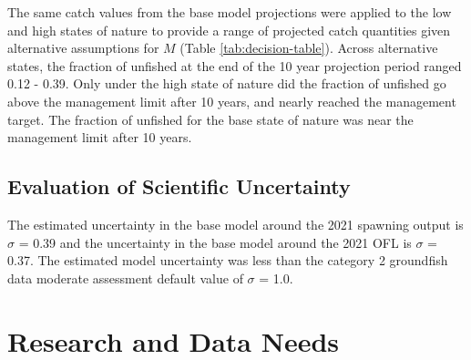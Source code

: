 \documentclass[11pt,
  english,
  letterpaper,
]{article}
\begin{document}
The same catch values from the base model projections were applied to the low and high states of nature to provide a range of projected catch quantities given alternative assumptions for {\(M\)\leavevmode\tagmcend\tagstructend} (Table \ref{tab:decision-table}). Across alternative states, the fraction of unfished at the end of the 10 year projection period ranged 0.12 - 0.39. Only under the high state of nature did the fraction of unfished go above the management limit after 10 years, and nearly reached the management target. The fraction of unfished for the base state of nature was near the management limit after 10 years.

\leavevmode\tagmcend\tagstructend\par


\hypertarget{evaluation-of-scientific-uncertainty}{%
\subsection{Evaluation of Scientific Uncertainty}\label{evaluation-of-scientific-uncertainty}}

\leavevmode\tagmcend\tagstructend


The estimated uncertainty in the base model around the 2021 spawning output is {\(\sigma\)\leavevmode\tagmcend\tagstructend} = 0.39 and the uncertainty in the base model around the 2021 OFL is {\(\sigma\)\leavevmode\tagmcend\tagstructend} = 0.37. The estimated model uncertainty was less than the category 2 groundfish data moderate assessment default value of {\(\sigma\)\leavevmode\tagmcend\tagstructend} = 1.0.

\leavevmode\tagmcend\tagstructend\par


\hypertarget{research-and-data-needs}{%
\section{Research and Data Needs}\label{research-and-data-needs}}

\leavevmode\tagmcend\tagstructend
\end{document}
